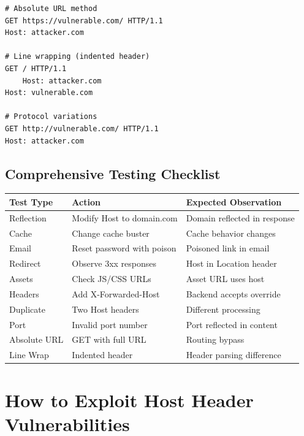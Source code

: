 \documentclass[12pt,a4paper]{article}
\begin{document}
\begin{lstlisting}[caption=Ambiguous Request Tests]
# Absolute URL method
GET https://vulnerable.com/ HTTP/1.1
Host: attacker.com

# Line wrapping (indented header)
GET / HTTP/1.1
    Host: attacker.com
Host: vulnerable.com

# Protocol variations
GET http://vulnerable.com/ HTTP/1.1
Host: attacker.com
\end{lstlisting}


\subsection{Comprehensive Testing Checklist}

\begin{longtable}{|p{3cm}|p{5cm}|p{5cm}|}
    \hline
    \textbf{Test Type} & \textbf{Action} & \textbf{Expected Observation} \\
    \hline
    Reflection & Modify Host to domain.com & Domain reflected in response \\
    \hline
    Cache & Change cache buster & Cache behavior changes \\
    \hline
    Email & Reset password with poison & Poisoned link in email \\
    \hline
    Redirect & Observe 3xx responses & Host in Location header \\
    \hline
    Assets & Check JS/CSS URLs & Asset URL uses host \\
    \hline
    Headers & Add X-Forwarded-Host & Backend accepts override \\
    \hline
    Duplicate & Two Host headers & Different processing \\
    \hline
    Port & Invalid port number & Port reflected in content \\
    \hline
    Absolute URL & GET with full URL & Routing bypass \\
    \hline
    Line Wrap & Indented header & Header parsing difference \\
    \hline
\end{longtable}

\section{How to Exploit Host Header Vulnerabilities}
\end{document}
